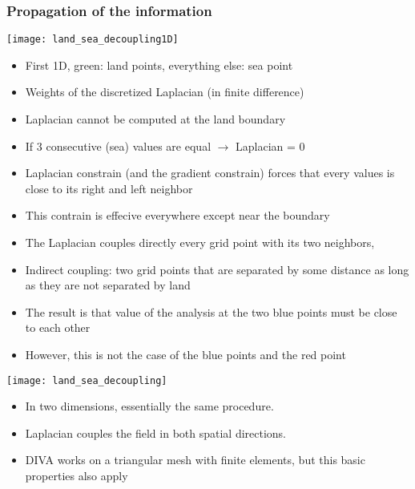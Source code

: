 \begin{frame}[allowframebreaks]
\frametitle{Propagation of the information}

\centerline{\texttt{[image: land\_sea\_decoupling1D]}}


\begin{itemize}
\item First 1D, green: land points, everything else: sea point
\item Weights of the discretized Laplacian (in finite difference)
\item Laplacian cannot be computed at the land boundary
\item If 3 consecutive (sea) values are equal $\rightarrow$ Laplacian = 0
\item Laplacian constrain (and the gradient constrain) forces that every values is close to its right and left neighbor
\item This contrain is effecive everywhere except near the boundary
\item The Laplacian couples directly every grid point with its two neighbors,
\item Indirect coupling: two grid points that are separated by some distance as long as they are not separated by land
\item The result is that value of the analysis at the two blue points must be close to each other
\item However, this is not the case of the blue points and the red point
\end{itemize}


\centerline{\texttt{[image: land\_sea\_decoupling]}}

\begin{itemize}
\item In two dimensions, essentially the same procedure.
\item Laplacian couples the field in both spatial directions.
\item DIVA works on a triangular mesh with finite elements, but this basic properties also apply
\end{itemize}

\end{frame}


